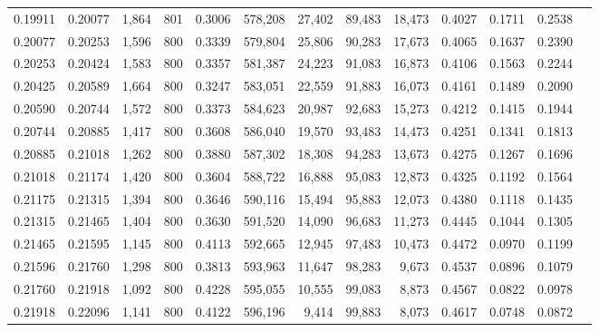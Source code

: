 \begin{tabular}{rrrrrrrrrrrrr}
0.19911 & 0.20077 &  1,864 & 801 &                                     0.3006 & 578,208 &  27,402 &  89,483 &  18,473 & 0.4027 & 0.1711 & 0.2538 \\
0.20077 & 0.20253 &  1,596 & 800 &                                     0.3339 & 579,804 &  25,806 &  90,283 &  17,673 & 0.4065 & 0.1637 & 0.2390 \\
0.20253 & 0.20424 &  1,583 & 800 &                                     0.3357 & 581,387 &  24,223 &  91,083 &  16,873 & 0.4106 & 0.1563 & 0.2244 \\
0.20425 & 0.20589 &  1,664 & 800 &                                     0.3247 & 583,051 &  22,559 &  91,883 &  16,073 & 0.4161 & 0.1489 & 0.2090 \\
0.20590 & 0.20744 &  1,572 & 800 &                                     0.3373 & 584,623 &  20,987 &  92,683 &  15,273 & 0.4212 & 0.1415 & 0.1944 \\
0.20744 & 0.20885 &  1,417 & 800 &                                     0.3608 & 586,040 &  19,570 &  93,483 &  14,473 & 0.4251 & 0.1341 & 0.1813 \\
0.20885 & 0.21018 &  1,262 & 800 &                                     0.3880 & 587,302 &  18,308 &  94,283 &  13,673 & 0.4275 & 0.1267 & 0.1696 \\
0.21018 & 0.21174 &  1,420 & 800 &                                     0.3604 & 588,722 &  16,888 &  95,083 &  12,873 & 0.4325 & 0.1192 & 0.1564 \\
0.21175 & 0.21315 &  1,394 & 800 &                                     0.3646 & 590,116 &  15,494 &  95,883 &  12,073 & 0.4380 & 0.1118 & 0.1435 \\
0.21315 & 0.21465 &  1,404 & 800 &                                     0.3630 & 591,520 &  14,090 &  96,683 &  11,273 & 0.4445 & 0.1044 & 0.1305 \\
0.21465 & 0.21595 &  1,145 & 800 &                                     0.4113 & 592,665 &  12,945 &  97,483 &  10,473 & 0.4472 & 0.0970 & 0.1199 \\
0.21596 & 0.21760 &  1,298 & 800 &                                     0.3813 & 593,963 &  11,647 &  98,283 &   9,673 & 0.4537 & 0.0896 & 0.1079 \\
0.21760 & 0.21918 &  1,092 & 800 &                                     0.4228 & 595,055 &  10,555 &  99,083 &   8,873 & 0.4567 & 0.0822 & 0.0978 \\
0.21918 & 0.22096 &  1,141 & 800 &                                     0.4122 & 596,196 &   9,414 &  99,883 &   8,073 & 0.4617 & 0.0748 & 0.0872 \\

\end{tabular}
